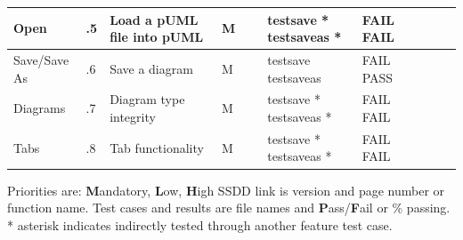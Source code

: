 \documentclass[twoside,letterpaper]{article}
\begin{document}
\begin{landscape}
\begin{flushleft}
\begin{supertabular}[c]{|
                        m{0.9in}|m{0.4in}|m{2.0in}|
                        m{0.4in}|m{0.5in}|m{1.0in}|
                        m{1.0in}|m{1.0in}|c|
                       }
  Open
  & .5
  & Load a pUML file into pUML 
  & \centering M 
  & ~ 
  & testsave *\newline
    testsaveas *
  & FAIL \newline
    FAIL 
  & ~ \newline
    ~
  & ~ \newline
    ~
\\\hline

  Save/Save As
  & .6
  & Save a diagram 
  & \centering M 
  & ~ 
  & testsave \newline 
    testsaveas
  & FAIL \newline
    PASS
  & ~ \newline
    ~
  & ~ \newline
    ~
\\\hline

  Diagrams
  & .7
  & Diagram type integrity 
  & \centering M 
  & ~ 
  & testsave *\newline 
    testsaveas *
  & FAIL \newline
    FAIL
  & ~ \newline
    ~
  & ~ \newline
    ~
\\\hline

  Tabs
  & .8
  & Tab functionality 
  & \centering M 
  & ~ 
  & testsave *\newline 
    testsaveas *
  & FAIL \newline
    FAIL
  & ~ \newline
    ~
  & ~ \newline
    ~
\\\hline

\end{supertabular}
\end{flushleft}

{Priorities are: \textbf{M}andatory, \textbf{L}ow, \textbf{H}igh} \newline
{SSDD link is version and page number or function name.} \newline
{Test cases and results are file names and \textbf{P}ass/\textbf  {F}ail or \% passing.} \newline
{* asterisk indicates indirectly tested through another feature test case.}

\bigskip

\end{landscape}
\end{document}
